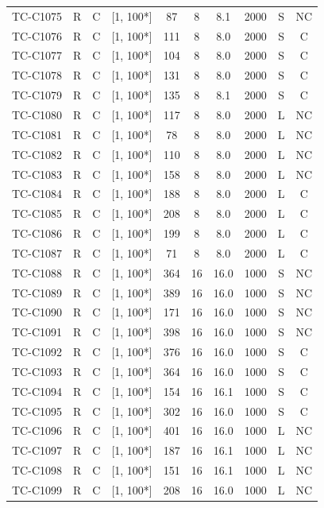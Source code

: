 \begin{longtable}{lccccccccc}
TC-C1075 & R & C & [1, 100*] & 87 & 8 & 8.1 & 2000 & S & NC \\
TC-C1076 & R & C & [1, 100*] & 111 & 8 & 8.0 & 2000 & S & C \\
TC-C1077 & R & C & [1, 100*] & 104 & 8 & 8.0 & 2000 & S & C \\
TC-C1078 & R & C & [1, 100*] & 131 & 8 & 8.0 & 2000 & S & C \\
TC-C1079 & R & C & [1, 100*] & 135 & 8 & 8.1 & 2000 & S & C \\
TC-C1080 & R & C & [1, 100*] & 117 & 8 & 8.0 & 2000 & L & NC \\
TC-C1081 & R & C & [1, 100*] & 78 & 8 & 8.0 & 2000 & L & NC \\
TC-C1082 & R & C & [1, 100*] & 110 & 8 & 8.0 & 2000 & L & NC \\
TC-C1083 & R & C & [1, 100*] & 158 & 8 & 8.0 & 2000 & L & NC \\
TC-C1084 & R & C & [1, 100*] & 188 & 8 & 8.0 & 2000 & L & C \\
TC-C1085 & R & C & [1, 100*] & 208 & 8 & 8.0 & 2000 & L & C \\
TC-C1086 & R & C & [1, 100*] & 199 & 8 & 8.0 & 2000 & L & C \\
TC-C1087 & R & C & [1, 100*] & 71 & 8 & 8.0 & 2000 & L & C \\
TC-C1088 & R & C & [1, 100*] & 364 & 16 & 16.0 & 1000 & S & NC \\
TC-C1089 & R & C & [1, 100*] & 389 & 16 & 16.0 & 1000 & S & NC \\
TC-C1090 & R & C & [1, 100*] & 171 & 16 & 16.0 & 1000 & S & NC \\
TC-C1091 & R & C & [1, 100*] & 398 & 16 & 16.0 & 1000 & S & NC \\
TC-C1092 & R & C & [1, 100*] & 376 & 16 & 16.0 & 1000 & S & C \\
TC-C1093 & R & C & [1, 100*] & 364 & 16 & 16.0 & 1000 & S & C \\
TC-C1094 & R & C & [1, 100*] & 154 & 16 & 16.1 & 1000 & S & C \\
TC-C1095 & R & C & [1, 100*] & 302 & 16 & 16.0 & 1000 & S & C \\
TC-C1096 & R & C & [1, 100*] & 401 & 16 & 16.0 & 1000 & L & NC \\
TC-C1097 & R & C & [1, 100*] & 187 & 16 & 16.1 & 1000 & L & NC \\
TC-C1098 & R & C & [1, 100*] & 151 & 16 & 16.1 & 1000 & L & NC \\
TC-C1099 & R & C & [1, 100*] & 208 & 16 & 16.0 & 1000 & L & NC \\

\end{longtable}
